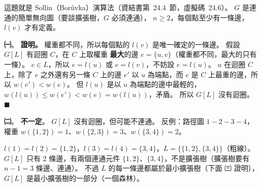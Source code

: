 \begin{pastsoln}
這題就是 Sollin（Borůvka）演算法（資結書第~24.4~節，虛擬碼~24.6）。 $G$ 是連通的簡單無向圖（要談擴張樹，$G$ 必須連通），
$n \ge 2$，每個點至少有一條邊，$l(v)$ 才有定義。

\textbf{㈠}。 \textbf{證明。} 權重都不同，所以每個點的 $l(v)$ 是唯一確定的一條邊。 假設 $G[L]$ 有迴圈 $C$，在 $C$ 上取權重
\textbf{最大}的邊 $e = \{u, v\}$（權重都不同，最大的只有一條）。 $e \in L$，所以 $e = l(u)$ 或 $e = l(v)$，不妨設 $e = l(u)$。
$u$ 在迴圈 $C$ 上，除了 $e$ 之外還有另一條 $C$ 上的邊 $e'$ 以 $u$ 為端點，而 $e$ 是 $C$ 上最重的邊，所以
$w(e') < w(e)$。 但 $l(u)$ 是以 $u$ 為端點的邊中最輕的，$w(l(u)) \le w(e') < w(e) = w(l(u))$，矛盾。 所以 $G[L]$ 沒有迴圈。
\hfill$\blacksquare$

\textbf{㈡}。 \textbf{不一定}。 $G[L]$ 沒有迴圈，但可能不連通。 反例：路徑圖 $1 - 2 - 3 - 4$，權重
$w(\{1,2\}) = 1$、$w(\{2,3\}) = 3$、$w(\{3,4\}) = 2$。
\begin{center}
\end{center}
$l(1) = l(2) = \{1,2\}$，$l(3) = l(4) = \{3,4\}$，$L = \{\{1,2\}, \{3,4\}\}$（粗線）。 $G[L]$ 只有 $2$ 條邊，有兩個連通元件
$\{1,2\}$、$\{3,4\}$，不是擴張樹（擴張樹要有 $n - 1 = 3$ 條邊、連通）。 不過 $L$ 的每一條邊都屬於最小擴張樹（下面 ㈢ 證明），
$G[L]$ 是最小擴張樹的一部分（一個森林）。


\end{pastsoln}
